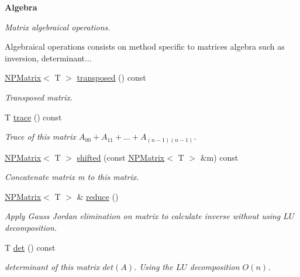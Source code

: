 \begin{Indent}\textbf{ Algebra}\par
{\em Matrix algebraical operations.

Algebraical operations consists on method specific to matrices algebra such as inversion, determinant... }\begin{DoxyCompactItemize}
\item 
\mbox{\hyperlink{class_n_p_matrix}{N\+P\+Matrix}}$<$ T $>$ \mbox{\hyperlink{class_n_p_matrix_abb4f410d97dc7e89798c67112c1e1bd3}{transposed}} () const
\begin{DoxyCompactList}\small\item\em Transposed matrix. \end{DoxyCompactList}\item 
T \mbox{\hyperlink{class_n_p_matrix_a007a87743223b6dddaa3ec8e44489ffb}{trace}} () const
\begin{DoxyCompactList}\small\item\em Trace of this matrix $ A_{00} + A_{11} + ... + A_{(n-1)(n-1)} $. \end{DoxyCompactList}\item 
\mbox{\hyperlink{class_n_p_matrix}{N\+P\+Matrix}}$<$ T $>$ \mbox{\hyperlink{class_n_p_matrix_ac46001932fe08670105f2b51dc72c32b}{shifted}} (const \mbox{\hyperlink{class_n_p_matrix}{N\+P\+Matrix}}$<$ T $>$ \&m) const
\begin{DoxyCompactList}\small\item\em Concatenate matrix {\ttfamily m} to {\ttfamily this} matrix. \end{DoxyCompactList}\item 
\mbox{\hyperlink{class_n_p_matrix}{N\+P\+Matrix}}$<$ T $>$ \& \mbox{\hyperlink{class_n_p_matrix_ae9789161bbe6c4dc9be0bd8908313a29}{reduce}} ()
\begin{DoxyCompactList}\small\item\em Apply Gauss Jordan elimination on matrix to calculate inverse without using $ LU $ decomposition. \end{DoxyCompactList}\item 
T \mbox{\hyperlink{class_n_p_matrix_afea28129e85911922957e9013d81e79a}{det}} () const
\begin{DoxyCompactList}\small\item\em determinant of this matrix $ det(A) $. Using the $ LU $ decomposition $ O(n) $. \end{DoxyCompactList}\end{DoxyCompactItemize}
\end{Indent}
